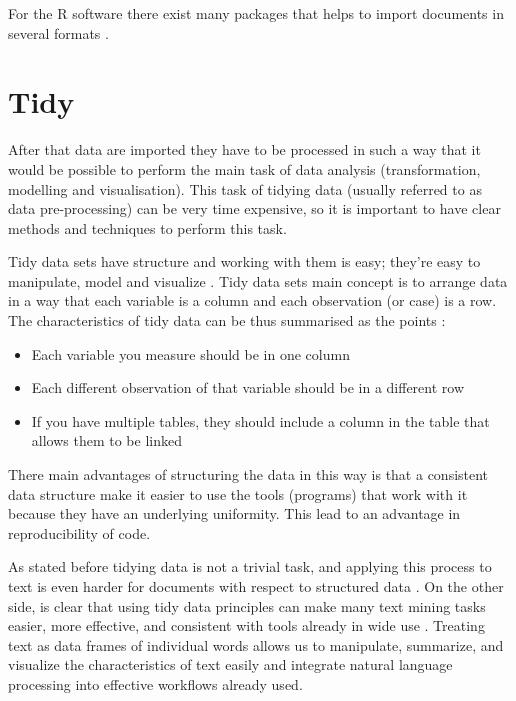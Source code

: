 \documentclass[]{book}
\providecommand{\tightlist}{%
  \setlength{\itemsep}{0pt}\setlength{\parskip}{0pt}}
\begin{document}
For the R software there exist many packages that helps to import
documents in several formats \citep{readr2017r}.

\section{Tidy}\label{sotatoolstidy}

After that data are imported they have to be processed in such a way
that it would be possible to perform the main task of data analysis
(transformation, modelling and visualisation). This task of tidying data
(usually referred to as data pre-processing) can be very time expensive,
so it is important to have clear methods and techniques to perform this
task.

Tidy data sets have structure and working with them is easy; they're
easy to manipulate, model and visualize \citep{wickham2014tidy}. Tidy
data sets main concept is to arrange data in a way that each variable is
a column and each observation (or case) is a row. The characteristics of
tidy data can be thus summarised as the points \citep{leek2015elements}:

\begin{itemize}
\tightlist
\item
  Each variable you measure should be in one column
\item
  Each different observation of that variable should be in a different
  row
\item
  If you have multiple tables, they should include a column in the table
  that allows them to be linked
\end{itemize}

There main advantages of structuring the data in this way is that a
consistent data structure make it easier to use the tools (programs)
that work with it because they have an underlying uniformity. This lead
to an advantage in reproducibility of code.

As stated before tidying data is not a trivial task, and applying this
process to text is even harder for documents with respect to structured
data \citep{silge2016tidytext}. On the other side, is clear that using
tidy data principles can make many text mining tasks easier, more
effective, and consistent with tools already in wide use . Treating text
as data frames of individual words allows us to manipulate, summarize,
and visualize the characteristics of text easily and integrate natural
language processing into effective workflows already used.
\end{document}
